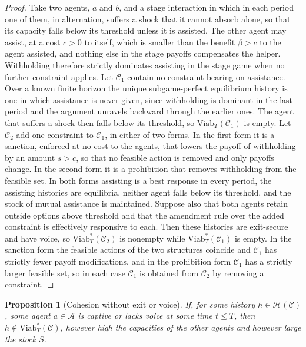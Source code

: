 \documentclass[12pt]{article}
\newtheorem{proposition}{Proposition}[section]
\begin{document}
\begin{proof}
Take two agents, $a$ and $b$, and a stage interaction in which in each period one of them, in alternation, suffers a shock that it cannot absorb alone, so that its capacity falls below its threshold unless it is assisted. The other agent may assist, at a cost $c>0$ to itself, which is smaller than the benefit $\beta>c$ to the agent assisted, and nothing else in the stage payoffs compensates the helper. Withholding therefore strictly dominates assisting in the stage game when no further constraint applies. Let $\mathcal C_1$ contain no constraint bearing on assistance. Over a known finite horizon the unique subgame-perfect equilibrium history is one in which assistance is never given, since withholding is dominant in the last period and the argument unravels backward through the earlier ones. The agent that suffers a shock then falls below its threshold, so $\mathrm{Viab}_T(\mathcal C_1)$ is empty. Let $\mathcal C_2$ add one constraint to $\mathcal C_1$, in either of two forms. In the first form it is a sanction, enforced at no cost to the agents, that lowers the payoff of withholding by an amount $s>c$, so that no feasible action is removed and only payoffs change. In the second form it is a prohibition that removes withholding from the feasible set. In both forms assisting is a best response in every period, the assisting histories are equilibria, neither agent falls below its threshold, and the stock of mutual assistance is maintained. Suppose also that both agents retain outside options above threshold and that the amendment rule over the added constraint is effectively responsive to each. Then these histories are exit-secure and have voice, so $\mathrm{Viab}^{*}_T(\mathcal C_2)$ is nonempty while $\mathrm{Viab}^{*}_T(\mathcal C_1)$ is empty. In the sanction form the feasible actions of the two structures coincide and $\mathcal C_1$ has strictly fewer payoff modifications, and in the prohibition form $\mathcal C_1$ has a strictly larger feasible set, so in each case $\mathcal C_1$ is obtained from $\mathcal C_2$ by removing a constraint.
\end{proof}

\begin{proposition}[Cohesion without exit or voice]\label{prop:cohesion}
If, for some history $h\in\mathcal H(\mathcal C)$, some agent $a\in\mathcal A$ is captive or lacks voice at some time $t\le T$, then $h\notin\mathrm{Viab}^{*}_T(\mathcal C)$, however high the capacities of the other agents and however large the stock $S$.
\end{proposition}
\end{document}
